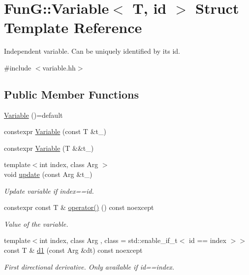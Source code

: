 \hypertarget{structFunG_1_1Variable}{}\section{FunG\+:\+:Variable$<$ T, id $>$ Struct Template Reference}
\label{structFunG_1_1Variable}


Independent variable. Can be uniquely identified by its id.  




{\ttfamily \#include $<$variable.\+hh$>$}

\subsection*{Public Member Functions}
\begin{DoxyCompactItemize}
\item 
\hyperlink{structFunG_1_1Variable_a20d207e651ee9e93c86dfa4ea1053f56}{Variable} ()=default
\item 
constexpr \hyperlink{structFunG_1_1Variable_af77daee887434f3fe1902bdfcb2639a0}{Variable} (const T \&t\+\_\+)
\item 
constexpr \hyperlink{structFunG_1_1Variable_ac3e65c76a69913a23d53c84ce01e602a}{Variable} (T \&\&t\+\_\+)
\item 
{\footnotesize template$<$int index, class Arg $>$ }\\void \hyperlink{structFunG_1_1Variable_a50f4d34586aa6a89df604503e0a3c2a9}{update} (const Arg \&t\+\_\+)
\begin{DoxyCompactList}\small\item\em Update variable if index==id. \end{DoxyCompactList}\item 
constexpr const T \& \hyperlink{structFunG_1_1Variable_afc527158ee42ca6f9a91a465d077fb65}{operator()} () const noexcept
\begin{DoxyCompactList}\small\item\em Value of the variable. \end{DoxyCompactList}\item 
{\footnotesize template$<$int index, class Arg , class  = std\+::enable\+\_\+if\+\_\+t$<$ id == index $>$$>$ }\\const T \& \hyperlink{structFunG_1_1Variable_a9384160b4015767ffe6a058583fef10a}{d1} (const Arg \&dt) const noexcept
\begin{DoxyCompactList}\small\item\em First directional derivative. Only available if id==index. \end{DoxyCompactList}\end{DoxyCompactItemize}


